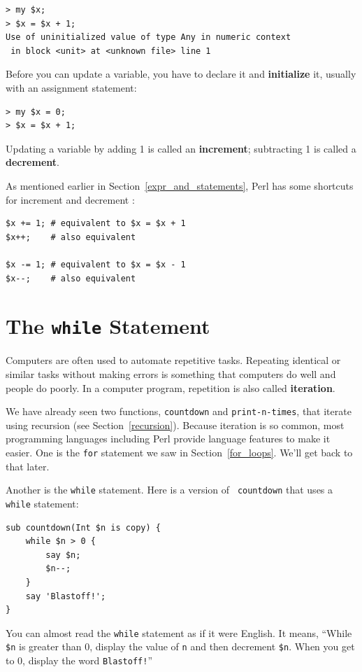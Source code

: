 \begin{verbatim}
> my $x;
> $x = $x + 1;
Use of uninitialized value of type Any in numeric context 
 in block <unit> at <unknown file> line 1
\end{verbatim}
%
Before you can update a variable, you have to declare it and 
{\bf initialize} it, usually with an assignment statement:

\begin{verbatim}
> my $x = 0;
> $x = $x + 1;
\end{verbatim}
%
Updating a variable by adding 1 is called an {\bf increment};
subtracting 1 is called a {\bf decrement}.

As mentioned earlier in Section~\ref{expr_and_statements}, 
Perl has some shortcuts for increment and decrement :

\begin{verbatim}
$x += 1; # equivalent to $x = $x + 1
$x++;    # also equivalent 

$x -= 1; # equivalent to $x = $x - 1
$x--;    # also equivalent 
\end{verbatim}

\section{The {\tt while} Statement}

Computers are often used to automate repetitive tasks.  Repeating
identical or similar tasks without making errors is something that
computers do well and people do poorly.  In a computer program,
repetition is also called {\bf iteration}.

We have already seen two functions, {\tt countdown} and
\verb"print-n-times", that iterate using recursion 
(see Section~\ref{recursion}).  Because 
iteration is so common, most programming languages including 
Perl provide language features to make it easier.
One is the {\tt for} statement we saw in Section~\ref{for_loops}.
We'll get back to that later.

Another is the {\tt while} statement.  Here is a version of {\tt
countdown} that uses a {\tt while} statement:

\begin{verbatim}
sub countdown(Int $n is copy) {
    while $n > 0 {
        say $n;
        $n--;
    }
    say 'Blastoff!';
}
\end{verbatim}
%
You can almost read the {\tt while} statement as if it were English.
It means, ``While {\tt \$n} is greater than 0,
display the value of {\tt n} and then decrement
{\tt \$n}.  When you get to 0, display the word {\tt Blastoff!}''

